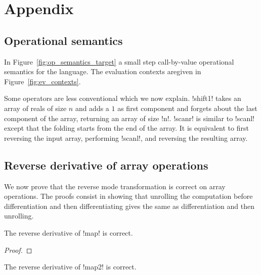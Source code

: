\section{Appendix}

 \subsection{Operational semantics}

In Figure~\ref{fig:op_semantics_target} a small step call-by-value operational semantics for the language. 
The evaluation contexts aregiven in Figure~\ref{fig:ev_contexts}. 



Some operators are less conventional which we now explain.
!shift1! takes an array of reals of size $n$ and adds a $1$ as first component and forgets about the last component of the array, returning an array of size !n!.
!scanr! is similar to !scanl! except that the folding starts from the end of the array. 
It is equivalent to first reversing the input array, performing !scanl!, and reversing the resulting array.





 \subsection{Reverse derivative of array operations}

We now prove that the reverse mode transformation is correct on array operations. 
The proofs consist in showing that unrolling the computation before differentiation 
and then differentiating gives the same as differentiation and then unrolling. 

 \begin{proposition}
     The reverse derivative of !map! is correct.
 \end{proposition}

\begin{proof}
    
\end{proof}

 \begin{proposition}
    The reverse derivative of !map2! is correct.
\end{proposition}

